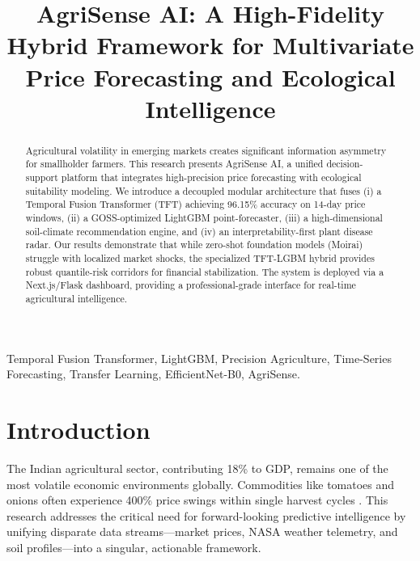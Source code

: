 \documentclass[conference]{IEEEtran}
\begin{document}
\title{AgriSense AI: A High-Fidelity Hybrid Framework for Multivariate Price Forecasting and Ecological Intelligence}

\author{
}

\maketitle

\begin{abstract}
Agricultural volatility in emerging markets creates significant information asymmetry for smallholder farmers. This research presents AgriSense AI, a unified decision-support platform that integrates high-precision price forecasting with ecological suitability modeling. We introduce a decoupled modular architecture that fuses (i) a Temporal Fusion Transformer (TFT) achieving 96.15\% accuracy on 14-day price windows, (ii) a GOSS-optimized LightGBM point-forecaster, (iii) a high-dimensional soil-climate recommendation engine, and (iv) an interpretability-first plant disease radar. Our results demonstrate that while zero-shot foundation models (Moirai) struggle with localized market shocks, the specialized TFT-LGBM hybrid provides robust quantile-risk corridors for financial stabilization. The system is deployed via a Next.js/Flask dashboard, providing a professional-grade interface for real-time agricultural intelligence.
\end{abstract}

\begin{IEEEkeywords}
Temporal Fusion Transformer, LightGBM, Precision Agriculture, Time-Series Forecasting, Transfer Learning, EfficientNet-B0, AgriSense.
\end{IEEEkeywords}

\section{Introduction}
The Indian agricultural sector, contributing 18\% to GDP, remains one of the most volatile economic environments globally. Commodities like tomatoes and onions often experience 400\% price swings within single harvest cycles \cite{nitiaayog2019}. This research addresses the critical need for forward-looking predictive intelligence by unifying disparate data streams—market prices, NASA weather telemetry, and soil profiles—into a singular, actionable framework.
\end{document}
